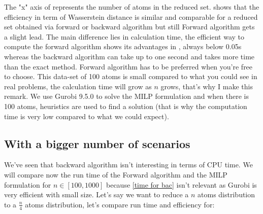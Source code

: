 \documentclass{amsart}
\begin{document}
The "x" axis of  represents the number of atoms in the reduced set.  shows that the efficiency in term of Wasserstein distance is similar and comparable for a reduced set obtained via forward or backward algorithm but still Forward algorithm gets a slight lead. The main difference lies in calculation time, the efficient way to compute the forward algorithm shows its advantages in , always below 0.05s whereas the backward algorithm can take up to one second and takes more time than the exact method. Forward algorithm has to be preferred when you're free to choose.  This data-set of 100 atoms is small compared to what you could see in real problems, the calculation time will grow as $n$ grows, that's why I make this remark. We use Gurobi 9.5.0 to solve the MILP formulation and when there is 100 atoms, heuristics are used to find a solution (that is why the computation time is very low compared to what we could expect). 

\subsection{With a bigger number of scenarios}
We've seen that backward algorithm isn't interesting in terms of CPU time. We will compare now the run time of the Forward algorithm and the MILP formulation for $n\in\left[100,1000\right]$ because \ref{time for bac} isn't relevant as Gurobi is very efficient with small size. Let's say we want to reduce a $n$ atoms distribution to a $\frac{n}{4}$ atoms distribution, let's compare run time and efficiency for:
\end{document}
